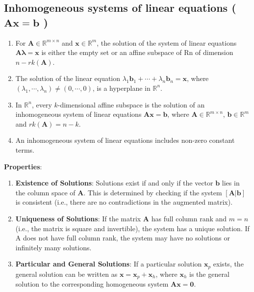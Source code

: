 \subsection{Inhomogeneous systems of linear equations ( $\mathbf{Ax = b}$ ) \cite{mfml-1, chatgpt}}\label{Inhomogeneous systems of linear equations}


\begin{enumerate}
    \item For $\mathbf{A} \in \mathbb{R}^{m\times n}$ and $\mathbf{x} \in \mathbb{R}^m$, the solution of the system of linear equations $\mathbf{A\boldsymbol{\lambda} = x}$ is either the empty set or an affine subspace of Rn of dimension $n - rk(\mathbf{A})$.

    \item The solution of the linear equation $\lambda_1\mathbf{b}_1 + \cdots + \lambda_n\mathbf{b}_n = \mathbf{x}$, where $(\lambda_1, \cdots , \lambda_n) \neq (0, \cdots , 0)$, is a hyperplane in $\mathbb{R}^n$.

    \item In $\mathbb{R}^n$, every $k$-dimensional affine subspace is the solution of an inhomogeneous system of linear equations $\mathbf{Ax = b}$, where $\mathbf{A} \in \mathbb{R}^{m\times n}$, $\mathbf{b} \in \mathbb{R}^m$ and $rk(\mathbf{A}) = n - k$.

    \item An inhomogeneous system of linear equations includes non-zero constant terms.
\end{enumerate}

\vspace{0.2cm}
\textbf{Properties}:
\begin{enumerate}
    \item \textbf{Existence of Solutions}: Solutions exist if and only if the vector $\mathbf{b}$ lies in the column space of $\mathbf{A}$. This is determined by checking if the system $\mathbf{[A|b]}$ is consistent (i.e., there are no contradictions in the augmented matrix).

    \item \textbf{Uniqueness of Solutions}: If the matrix $\mathbf{A}$ has full column rank and $m=n$ (i.e., the matrix is square and invertible), the system has a unique solution. If A does not have full column rank, the system may have no solutions or infinitely many solutions.

    \item \textbf{Particular and General Solutions}: If a particular solution $\mathbf{x}_p$ exists, the general solution can be written as $\mathbf{x}=\mathbf{x}_p +\mathbf{x}_h$, where $\mathbf{x}_h$ is the general solution to the corresponding homogeneous system $\mathbf{Ax=0}$.
\end{enumerate}

